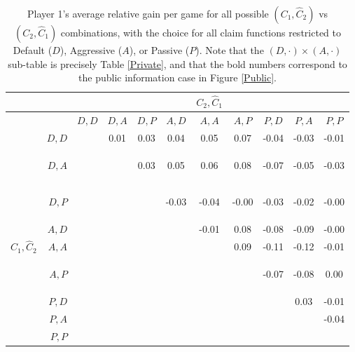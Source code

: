 \documentclass[12pt]{article}
\begin{document}
\begin{table}[h!]

  \begin{center}
    \begin{tabular}{c|rccccccccc} %
      &&&&&&$C_2,\hat{C}_1$&&&&\\
	  \hline
	  && $D,D$ & $D,A$ & $D,P$ & $A,D$ & $A,A$ & $A,P$ & $P,D$ & $P,A$ & $P,P$\\
	  &$D,D$ &  &0.01&0.03&0.04&0.05&0.07&-0.04&-0.03&-0.01\\ 
&$D,A$ &  &     &0.03&\begin{bf}0.05\end{bf}&0.06&0.08&-0.07&-0.05&-0.03\\ 
&$D,P$ &  &     &     &-0.03&-0.04&-0.00&\begin{bf}-0.03\end{bf}&-0.02&-0.00\\ 
&$A,D$ &  &     &     &     &-0.01&0.08&-0.08&-0.09&-0.00\\ 
$C_1,\hat{C}_2$&$A,A$ &  &     &     &     &     &0.09&-0.11&-0.12&-0.01\\ 
&$A,P$ &  &     &     &     &     &     &-0.07&\begin{bf}-0.08\end{bf}&0.00\\ 
&$P,D$ &  &     &     &     &     &     &     &0.03&-0.01\\ 
&$P,A$ &  &     &     &     &     &     &     &     &-0.04\\ 
&$P,P$ &  &     &     &     &     &     &     &     &     \\ 

	 \end{tabular}
  \end{center}
  \caption{Player 1's average relative gain per game for all possible $(C_1,\hat{C}_2)$ vs $(C_2,\hat{C}_1)$ combinations, with the choice for all claim functions restricted to Default ($D$), Aggressive ($A$), or Passive ($P$). Note that the $(D,\cdot) \times (A,\cdot)$ sub-table is precisely Table \ref{Private}, and that the bold numbers correspond to the public information case in Figure \ref{Public}.}
  \label{All}
\end{table}
\end{document}
